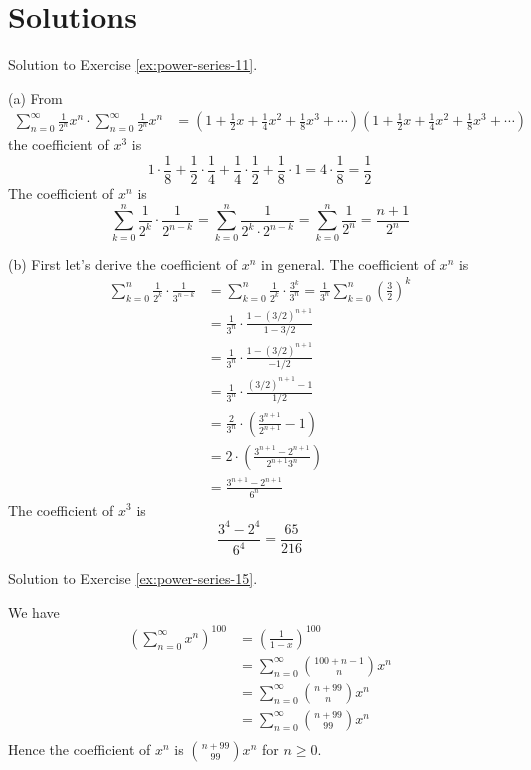 
\newpage
\section*{Solutions}
Solution to Exercise \ref{ex:power-series-11}.

 
(a) From
\begin{align*}
\sum_{n = 0}^\infty \frac{1}{2^n} x^n \cdot \sum_{n = 0}^\infty \frac{1}{2^n} x^n
&=
\left(
1 + \frac{1}{2}x + \frac{1}{4}x^2 + \frac{1}{8}x^3 + \cdots
\right)
\left(
1 + \frac{1}{2}x + \frac{1}{4}x^2 + \frac{1}{8}x^3 + \cdots
\right)
\end{align*}
the coefficient of $x^3$ is
\[
1 \cdot \frac{1}{8}
+ \frac{1}{2} \cdot \frac{1}{4}
+ \frac{1}{4} \cdot \frac{1}{2}
+ \frac{1}{8} \cdot 1
= 4 \cdot \frac{1}{8} = \frac{1}{2}
\]
The coefficient of $x^n$ is
\[
\sum_{k=0}^n \frac{1}{2^k} \cdot \frac{1}{2^{n-k}}
= \sum_{k=0}^n \frac{1}{2^k \cdot 2^{n-k}}
= \sum_{k=0}^n \frac{1}{2^n}
= \frac{n + 1}{2^n}
\]

(b)
First let's derive the coefficient of $x^n$ in general. 
The coefficient of $x^n$ is
\begin{align*}
\sum_{k=0}^n \frac{1}{2^k} \cdot \frac{1}{3^{n-k}}
&= \sum_{k=0}^n \frac{1}{2^k} \cdot \frac{3^k}{3^n} 
= \frac{1}{3^n} \sum_{k=0}^n \left(\frac{3}{2}\right)^k \\
&= \frac{1}{3^n} \cdot \frac{1 - (3/2)^{n+1}}{1 - 3/2} \\
&= \frac{1}{3^n} \cdot \frac{1 - (3/2)^{n+1}}{-1/2} \\
&= \frac{1}{3^n} \cdot \frac{(3/2)^{n+1} - 1}{1/2} \\
&= \frac{2}{3^n} \cdot \left( \frac{3^{n+1}}{2^{n+1}} - 1 \right) \\
&= 2 \cdot \left( \frac{3^{n+1} - 2^{n+1}}{2^{n+1}3^n} \right) \\
&= \frac{3^{n+1} - 2^{n+1}}{6^n}
\end{align*}
The coefficient of $x^3$ is
\[
\frac{3^4 - 2^{4}}{6^4} = \frac{65}{216}
\]



\newpage

Solution to Exercise \ref{ex:power-series-15}.

We have
\begin{align*}
\left( \sum_{n=0}^\infty x^n \right)^{100} 
&= \left( \frac{1}{1 - x} \right)^{100} \\
&= \sum_{n=0}^\infty \binom{100 + n - 1}{n} x^n \\
&= \sum_{n=0}^\infty \binom{n + 99}{n} x^n \\
&= \sum_{n=0}^\infty \binom{n + 99}{99} x^n \\
\end{align*}
Hence the coefficient of $x^n$ is $\binom{n + 99}{99} x^n$ for $n \geq 0$.


